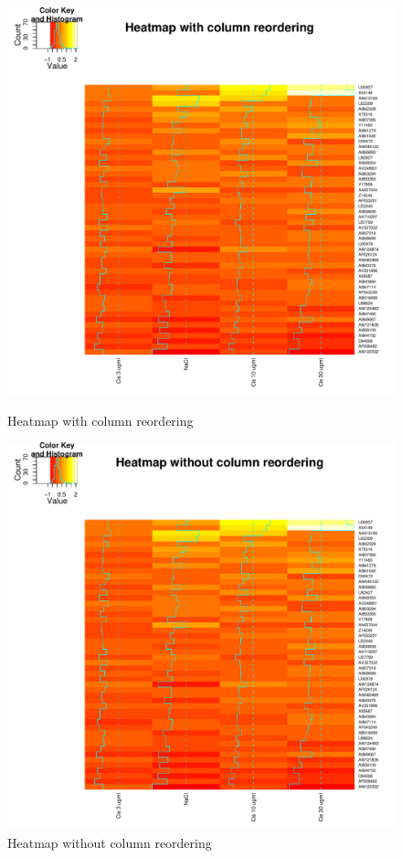 \documentclass[12pt, oneside, letterpaper]{article}
\begin{document}
\begin{figure}[p]
\begin{minipage}[t]{2.5in}
\centering
\includegraphics[width=\textwidth]{logDataColOrd}
\caption{Heatmap with column reordering}
\label{Heatmap with column reordering}
\end{minipage}
\hfill
\begin{minipage}[t]{2.5in}
\centering
\includegraphics[width=\textwidth]{logDataColOrdNo}
\caption{Heatmap without column reordering}
\label{Heatmap without column reordering}
\end{minipage}
\end{figure}
\end{document}
